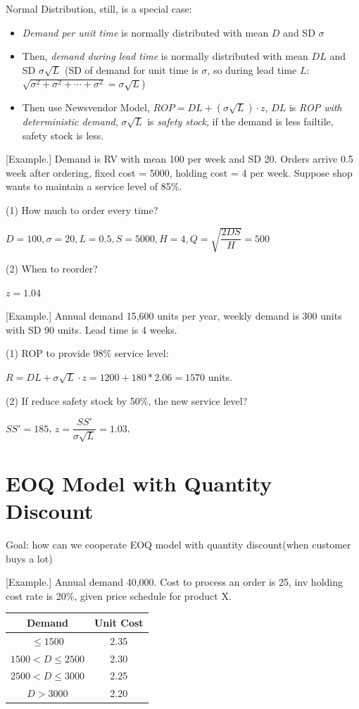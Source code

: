 \documentclass[11pt, a4paper]{ISOM2700}
\begin{document}
\begin{spacing}{1.5}
    Normal Distribution, still, is a special case: 
    \begin{itemize}
        \item {\it Demand per unit time} is normally distributed with mean $D$ and SD $\sigma$
        \item Then, {\it demand during lead time} is normally distributed with mean $DL$ and SD $\sigma \sqrt{L}$
        (SD of demand for unit time is $\sigma$, so during lead time $L$: $\sqrt{\sigma^2+\sigma^2+\cdots +\sigma^2}=\sigma\sqrt{L}$)
        \item Then use Newsvendor Model, $ROP=DL+(\sigma\sqrt{L})\cdot z$, $DL$ is {\it ROP with deterministic demand},
        $\sigma\sqrt{L}$ is {\it safety stock}, if the demand is less failtile, safety stock is less.
    \end{itemize}

    [Example.] Demand is RV with mean 100 per week and SD 20. Orders arrive 0.5 week after ordering,
    fixed cost = 5000, holding cost = 4 per week. Suppose shop wants to maintain a service level of 85\%.

    (1) How much to order every time?

    $D=100,\sigma=20,L=0.5,S=5000,H=4, Q=\sqrt{\dfrac{2DS}{H}}=500$

    (2) When to reorder?

    $z=1.04$

    [Example.] Annual demand 15,600 units per year, weekly demand is 300 units with SD 90 units.
    Lead time is 4 weeks.

    (1) ROP to provide 98\% service level:

    $R=DL+\sigma\sqrt{L}\cdot z=1200+180*2.06=1570$ units.

    (2) If reduce safety stock by 50\%, the new service level? 

    $SS'=185$, $z=\dfrac{SS'}{\sigma\sqrt{L}}=1.03$,

    \section{EOQ Model with Quantity Discount}

    Goal: how can we cooperate EOQ model with quantity discount(when customer buys a lot)

    [Example.] Annual demand 40,000. Cost to process an order is 25, inv holding cost rate 
    is 20\%, given price schedule for product X.
    \begin{center}
        \begin{tabular}{c|c}
            \hline\hline
            \setstretch{0.5}
            {\bf Demand} & {\bf Unit Cost}\\\hline
            $\le 1500$ & 2.35\\\hline
            $1500<D\le 2500$ & 2.30\\\hline
            $2500<D\le 3000$ & 2.25\\\hline
            $D>3000$ & 2.20\\\hline\hline
        \end{tabular}
    \end{center}


\end{spacing}
\end{document}
